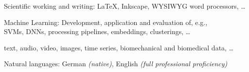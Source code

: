 \documentclass[10pt,a4paper]{article} %
\begin{document}
\vspace{5pt}
\inlineheadsection
{Scientific working and writing:}
{
        LaTeX, Inkscape, WYSIWYG word processors, \dots
}

\vspace{5pt}
\inlineheadsection
{Machine Learning:}
{
        Development, application and evaluation of, e.g.,\\
        SVMs, DNNs, processing pipelines, embeddings, clusterings, \dots
}

\vspace{5pt}
{
       text, audio, video, images, time series, biomechanical and biomedical data, \dots
}



\vspace{5pt}
\inlineheadsection %
{Natural languages:}
{
    German \textit{(native)}, English \textit{(full professional proficiency)}
}


\spacedhrule{1.6em}{-0.4em} %







\end{document}
